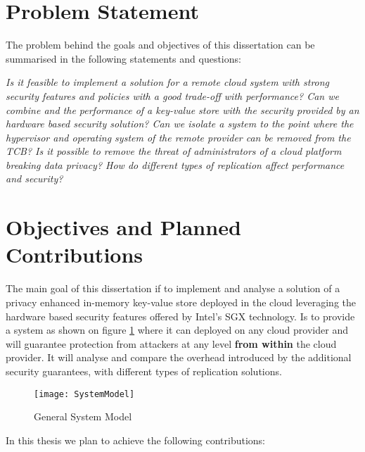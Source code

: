 
\section{Problem Statement} %
\label{sec:problem_statement}

The problem behind the goals and objectives of this dissertation can be summarised in the following statements and questions:

\textit{Is it feasible to implement a solution for a remote cloud system with strong security features and policies with a good trade-off with performance? Can we combine and the performance of a key-value store with the security provided by an hardware based security solution? Can we isolate a system to the point where the hypervisor and operating system of the remote provider can be removed from the \gls{TCB}? Is it possible to remove the threat of administrators of a cloud platform breaking data privacy? How do different types of replication affect performance and security?}

\section{Objectives and Planned Contributions} %
\label{sec:objectives_and_planned_contributions}

The main goal of this dissertation if to implement and analyse a solution of a privacy enhanced in-memory key-value store deployed in the cloud leveraging the hardware based security features offered by Intel's \gls{SGX} technology. Is to provide a system as shown on figure \ref{fig:system_model} where it can deployed on any cloud provider and will guarantee protection from attackers at any level \textbf{from within} the cloud provider. It will analyse and compare the overhead introduced by the additional security guarantees, with different types of replication solutions.

\begin{figure}[htbp]
	\centering
	{\texttt{[image: SystemModel]}}%
	\caption{General System Model}
	\label{fig:system_model}
\end{figure}

In this thesis we plan to achieve the following contributions:

